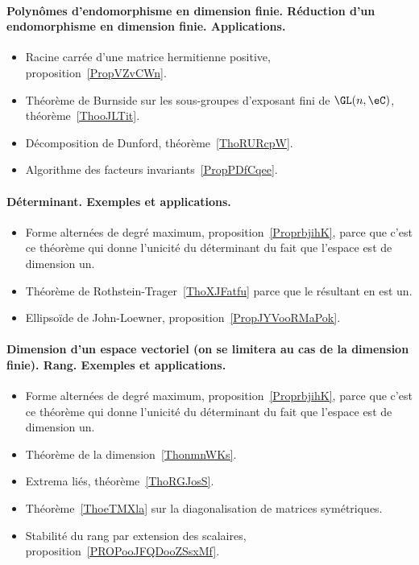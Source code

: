 \paragraph{Polynômes d'endomorphisme en dimension finie. Réduction d’un endomorphisme en dimension finie. Applications.}
\begin{itemize}
	\item Racine carrée d'une matrice hermitienne positive, proposition~\ref{PropVZvCWn}.
	\item Théorème de Burnside sur les sous-groupes d'exposant fini de \( \GL(n,\eC)\), théorème~\ref{ThooJLTit}.
	\item Décomposition de Dunford, théorème~\ref{ThoRURcpW}.
	\item Algorithme des facteurs invariants~\ref{PropPDfCqee}.
\end{itemize}
\paragraph{Déterminant. Exemples et applications.}
\begin{itemize}
	\item Forme alternées de degré maximum, proposition~\ref{ProprbjihK}, parce que c'est ce théorème qui donne l'unicité du déterminant du fait que l'espace est de dimension un.
	\item Théorème de Rothstein-Trager~\ref{ThoXJFatfu} parce que le résultant en est un.
	\item Ellipsoïde de John-Loewner, proposition~\ref{PropJYVooRMaPok}.
\end{itemize}
\paragraph{Dimension d'un espace vectoriel (on se limitera au cas de la dimension finie). Rang. Exemples et applications.}
\begin{itemize}
	\item Forme alternées de degré maximum, proposition~\ref{ProprbjihK}, parce que c'est ce théorème qui donne l'unicité du déterminant du fait que l'espace est de dimension un.
	\item Théorème de la dimension~\ref{ThonmnWKs}.
	\item Extrema liés, théorème~\ref{ThoRGJosS}.
	\item Théorème~\ref{ThoeTMXla} sur la diagonalisation de matrices symétriques.
	\item Stabilité du rang par extension des scalaires, proposition~\ref{PROPooJFQDooZSsxMf}.
\end{itemize}
